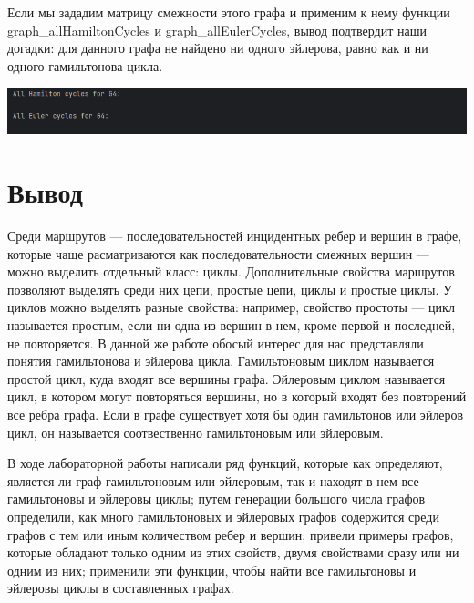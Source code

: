 \documentclass[12pt]{article}
\begin{document}
	Если мы зададим матрицу смежности этого графа и применим к нему функции graph\_allHamiltonCycles и graph\_allEulerCycles, вывод подтвердит наши догадки: для данного графа не найдено ни одного эйлерова, равно как и ни одного гамильтонова цикла.
	
	 
	
	\includegraphics[width=170mm]{images/G4.png}
	
	\section{Вывод}
	\label{final}
	
	Среди маршрутов --- последовательностей инцидентных ребер и вершин в графе, которые чаще расматриваются как последовательности смежных вершин --- можно выделить отдельный класс: циклы. Дополнительные свойства маршрутов позволяют выделять среди них цепи, простые цепи, циклы и простые циклы. У циклов можно выделять разные свойства: например, свойство простоты --- цикл называется простым, если ни одна из вершин в нем, кроме первой и последней, не повторяется. В данной же работе обосый интерес для нас представляли понятия гамильтонова и эйлерова цикла. Гамильтоновым циклом называется простой цикл, куда входят все вершины графа. Эйлеровым циклом называется цикл, в котором могут повторяться вершины, но в который входят без повторений все ребра графа. Если в графе существует хотя бы один гамильтонов или эйлеров цикл, он называется соотвественно гамильтоновым или эйлеровым.
	
	В ходе лабораторной работы написали ряд функций, которые как определяют, является ли граф гамильтоновым или эйлеровым, так и находят в нем все гамильтоновы и эйлеровы циклы; путем генерации большого числа графов определили, как много гамильтоновых и эйлеровых графов содержится среди графов с тем или иным количеством ребер и вершин; привели примеры графов, которые обладают только одним из этих свойств, двумя свойствами сразу или ни одним из них; применили эти функции, чтобы найти все гамильтоновы и эйлеровы циклы в составленных графах.
\end{document}
